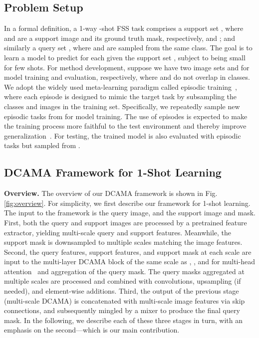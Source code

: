\documentclass[runningheads,table,xcdraw]{llncs}
\begin{document}
\subsection{Problem Setup}
\label{subsec:problem setting}
In a formal definition, a 1-way -shot FSS task  comprises a support set , where  and  are a support image and its ground truth mask, respectively, and ;
and similarly a query set , where  and  are sampled from the same class.
The goal is to learn a model to predict  for each  given the support set , subject to  being small for few shots.
For method development, suppose we have two image sets  and  for model training and evaluation, respectively, where  and  do not overlap in classes.
We adopt the widely used meta-learning paradigm called episodic training~\cite{vinyals2016matching}, where each episode is designed to mimic the target task by subsampling the classes and images in the training set.
Specifically, we repeatedly sample new episodic tasks  from  for model training.
The use of episodes is expected to make the training process more faithful to the test environment and thereby improve generalization~\cite{ravi2016optimization}.
For testing,
the trained model is also evaluated with episodic tasks but sampled from .


\subsection{DCAMA Framework for 1-Shot Learning}

\textbf{Overview.}\label{subsec:overview}
The overview of our DCAMA framework is shown in Fig. \ref{fig:overview}.
For simplicity, we first describe our framework for 1-shot learning.
The input to the framework is the query image, and the support image and mask.
First, both the query and support images are processed by a pretrained feature extractor, yielding multi-scale query and support features.
Meanwhile, the support mask is downsampled to multiple scales matching the image features.
Second, the query features, support features, and support mask at each scale are input to the multi-layer DCAMA block of the same scale as , , and  for multi-head attention~\cite{vaswani2017attention} and aggregation of the query mask.
The query masks aggregated at multiple scales are processed and combined with convolutions, upsampling (if needed), and element-wise additions. Third, the output of the previous stage (multi-scale DCAMA) is concatenated with multi-scale image features via skip connections, and subsequently mingled by a mixer to produce the final query mask.
In the following, we describe each of these three stages in turn, with an emphasis on the second---which is our main contribution.
\end{document}
